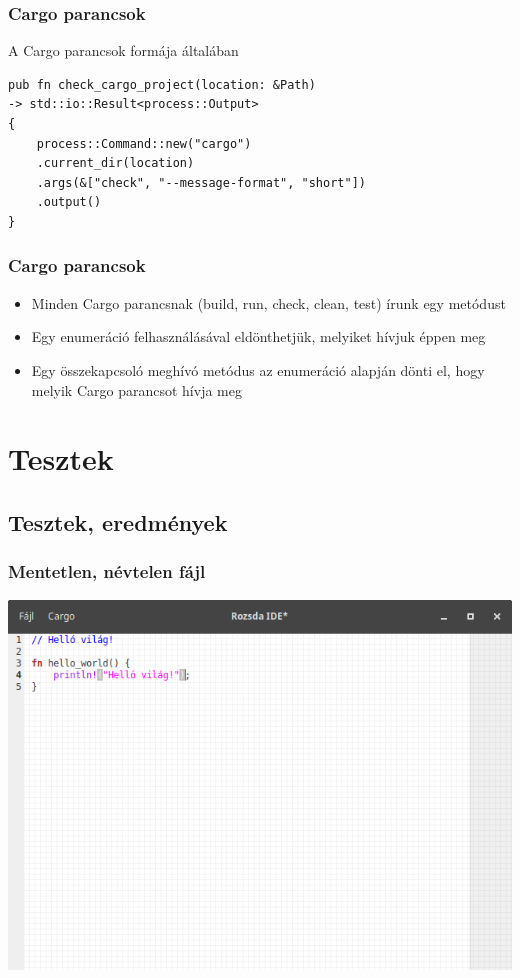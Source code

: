 \documentclass{beamer}
\begin{document}
    \begin{frame}[fragile]
        \frametitle{Cargo parancsok}

        \begin{block}{A Cargo parancsok formája általában}
            \begin{lstlisting}
pub fn check_cargo_project(location: &Path)
-> std::io::Result<process::Output>
{
    process::Command::new("cargo")
    .current_dir(location)
    .args(&["check", "--message-format", "short"])
    .output()
}
            \end{lstlisting}
        \end{block}
    \end{frame}

    \begin{frame}[fragile]
        \frametitle{Cargo parancsok}

        \begin{itemize}
            \item Minden Cargo parancsnak (build, run, check, clean, test) írunk egy metódust
            \item Egy enumeráció felhasználásával eldönthetjük, melyiket hívjuk éppen meg
            \item Egy összekapcsoló meghívó metódus az enumeráció alapján dönti el, hogy melyik Cargo parancsot hívja meg 
        \end{itemize}
    \end{frame}

    \section{Tesztek}
    \subsection{Tesztek, eredmények}

    \begin{frame}[fragile]
        \frametitle{Mentetlen, névtelen fájl}

        \begin{center}
            \includegraphics[scale=0.3]{kepek/nevtelen-fajl.png}
        \end{center}
    \end{frame}
\end{document}
